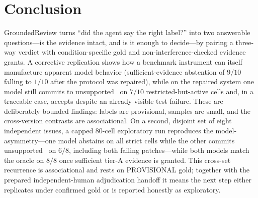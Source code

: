 \section{Conclusion}
\label{sec:conclusion}

GroundedReview turns ``did the agent say the right label?'' into two answerable
questions---is the evidence intact, and is it enough to decide---by pairing a
three-way verdict with condition-specific gold and non-interference-checked
evidence grants. A corrective replication shows how a benchmark instrument can
itself manufacture apparent model behavior (sufficient-evidence abstention of
$9/10$ falling to $1/10$ after the protocol was repaired), while on the
repaired system one model still commits to unsupported \ACCEPT\ on $7/10$
restricted-but-active cells and, in a traceable case, accepts despite an
already-visible test failure. These are deliberately bounded findings: labels
are provisional, samples are small, and the cross-version contrasts are
associational. On a second, disjoint set of eight independent issues, a
capped 80-cell exploratory run reproduces the model-asymmetry---one model
abstains on all strict cells while the other commits unsupported \ACCEPT\ on
$6/8$, including both failing patches---while both models match the oracle on
$8/8$ once sufficient tier-A evidence is granted. This cross-set recurrence
is associational and rests on PROVISIONAL gold; together with the prepared
independent-human adjudication handoff it means the next step either
replicates under confirmed gold or is reported honestly as exploratory.
